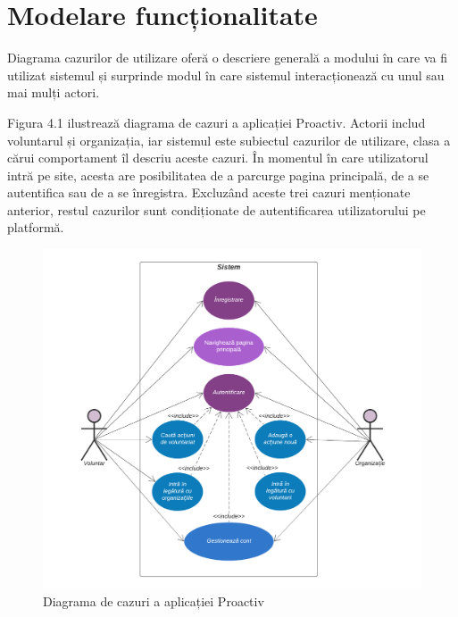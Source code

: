 \documentclass[12pt,a4paper]{report}
\begin{document}
\section{Modelare funcționalitate}
\par
Diagrama cazurilor de utilizare oferă o descriere generală a modului în care va fi utilizat sistemul și surprinde modul în care sistemul interacționează cu unul sau mai mulți actori.
\\
\par
Figura 4.1 ilustrează diagrama de cazuri a aplicației Proactiv. Actorii includ voluntarul și organizația, iar sistemul este subiectul cazurilor de utilizare, clasa a cărui comportament îl descriu aceste cazuri. 
În momentul în care utilizatorul intră pe site, acesta are posibilitatea de a parcurge pagina principală, de a se autentifica sau de a se înregistra. Excluzând aceste trei cazuri menționate anterior, restul cazurilor sunt condiționate de autentificarea utilizatorului pe platformă.
\\
\begin{figure}[h!]
  \centering
    \includegraphics[width=0.7\linewidth]{./imagini/UseCase.png}
    \caption{Diagrama de cazuri a aplicației Proactiv}
\end{figure}
\end{document}

